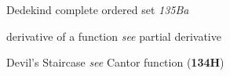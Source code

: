 \indexmedskip




























{Dedekind complete }
ordered set {\it 135Ba}





















































derivative of a function
  {\it see} partial derivative





















Devil's Staircase {\it see} Cantor function ({\bf 134H})











